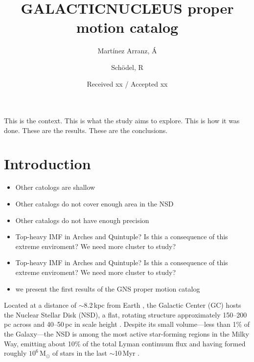 \documentclass{aa} %
\begin{document}
	
	\title{GALACTICNUCLEUS proper motion catalog}
	
	\author{Martínez Arranz, Á \and Schödel, R}
	
	\date{Received xx / Accepted xx}
	
	\abstract
	{This is the context.}
	{This is what the study aims to explore.}
	{This is how it was done.}
	{These are the results.}
	{These are the conclusions.}
	
	
	\maketitle
	
	\section{Introduction}
	\begin{itemize}
		\item Other catologs are shallow
		\item Other catalogs do not cover enough area in the NSD
		\item Other catalogs do not have enough precision 	
	    \item Top-heavy IMF in Arches and Quintuple? Is this a consequence of this extreme enviroment? We need more cluster to study?
	    \item Top-heavy IMF in Arches and Quintuple? Is this a consequence of this extreme enviroment? We need more cluster to study? 	 	
	    \item we present the first results of the GNS proper motion catalog
	\end{itemize}
	
	Located at a distance of $\sim$8.2\,kpc from Earth \citep{GC_distance_gravity}, the Galactic Center (GC) hosts the Nuclear Stellar Disk (NSD), a flat, rotating structure approximately 150–200\,pc across and 40–50\,pc in scale height \citep{Launhardt_2002, Sch2015, Ban_catalog, NSD_size1, Laly_2020, Sormani2022}. Despite its small volume—less than 1\% of the Galaxy—the NSD is among the most active star-forming regions in the Milky Way, emitting about 10\% of the total Lyman continuum flux \citep{Lyman_flux, Lyman_flux_II, Lyman_flux_III} and having formed roughly $10^6$\,M$_\odot$ of stars in the last $\sim$10\,Myr \citep{three_cepheids, paco_nature_2020, Paco_sfh}.
	
\end{document}
